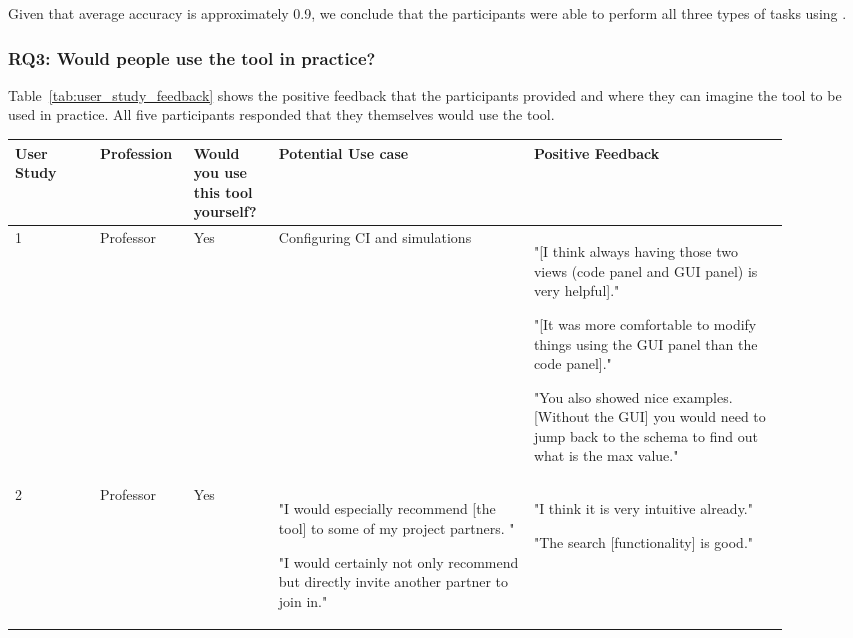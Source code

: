 Given that average accuracy is approximately 0.9, we conclude that the participants were able to perform all three types of tasks using \toolname{}.

\subsubsection{\textbf{RQ3:} Would people use the tool in practice?} %
Table~\ref{tab:user_study_feedback} shows the positive feedback that the participants provided and where they can imagine the tool to be used in practice.
All five participants responded that they themselves would use the tool.


\begin{table*} %
    \centering
    \caption{User Study - Would people use the tool in practice?}\label{tab:user_study_feedback}
    \begin{tabular}{p{0.1\linewidth}p{0.1\linewidth}p{0.1\linewidth}p{0.3\linewidth}p{0.3\linewidth}}
        \toprule
        \textbf{User Study} & \textbf{Profession} & \textbf{Would you use this tool yourself?} & \textbf{Potential Use case} & \textbf{Positive Feedback} \\
        \midrule
        1 & Professor & Yes & Configuring CI and simulations & 
        "[I think always having those two views (code panel and GUI panel) is very helpful]." 
        
        "[It was more comfortable to modify things using the GUI panel than the code panel]."
        
        "You also showed nice examples. [Without the GUI] you would need to jump back to the schema to find out what is the max value."
        \\
        \midrule
        2 & Professor & Yes & "I would especially recommend [the tool] to some of my project partners. "
        
        "I would certainly not only recommend but directly invite another partner to join in." & 
        "I think it is very intuitive already."
        
        "The search [functionality] is good."
        

\end{tabular}
\end{table*}
